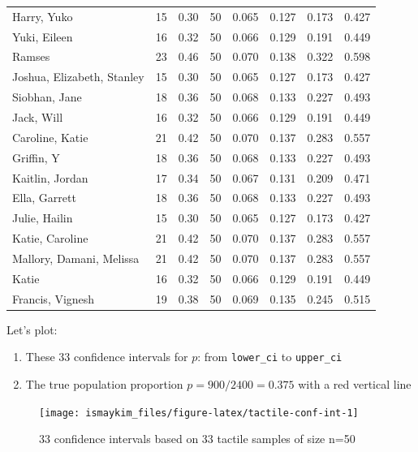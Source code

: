 \documentclass[12pt,]{krantz}
\providecommand{\tightlist}{%
  \setlength{\itemsep}{0pt}\setlength{\parskip}{0pt}}
\theoremstyle{definition}
\theoremstyle{definition}
\theoremstyle{definition}
\theoremstyle{remark}
\begin{document}
\begin{longtable}[t]{lrrrrrrr}
Harry, Yuko & 15 & 0.30 & 50 & 0.065 & 0.127 & 0.173 & 0.427\\
Yuki, Eileen & 16 & 0.32 & 50 & 0.066 & 0.129 & 0.191 & 0.449\\
\addlinespace
Ramses & 23 & 0.46 & 50 & 0.070 & 0.138 & 0.322 & 0.598\\
Joshua, Elizabeth, Stanley & 15 & 0.30 & 50 & 0.065 & 0.127 & 0.173 & 0.427\\
Siobhan, Jane & 18 & 0.36 & 50 & 0.068 & 0.133 & 0.227 & 0.493\\
Jack, Will & 16 & 0.32 & 50 & 0.066 & 0.129 & 0.191 & 0.449\\
Caroline, Katie & 21 & 0.42 & 50 & 0.070 & 0.137 & 0.283 & 0.557\\
\addlinespace
Griffin, Y & 18 & 0.36 & 50 & 0.068 & 0.133 & 0.227 & 0.493\\
Kaitlin, Jordan & 17 & 0.34 & 50 & 0.067 & 0.131 & 0.209 & 0.471\\
Ella, Garrett & 18 & 0.36 & 50 & 0.068 & 0.133 & 0.227 & 0.493\\
Julie, Hailin & 15 & 0.30 & 50 & 0.065 & 0.127 & 0.173 & 0.427\\
Katie, Caroline & 21 & 0.42 & 50 & 0.070 & 0.137 & 0.283 & 0.557\\
\addlinespace
Mallory, Damani, Melissa & 21 & 0.42 & 50 & 0.070 & 0.137 & 0.283 & 0.557\\
Katie & 16 & 0.32 & 50 & 0.066 & 0.129 & 0.191 & 0.449\\
Francis, Vignesh & 19 & 0.38 & 50 & 0.069 & 0.135 & 0.245 & 0.515\\*
\end{longtable}

\endgroup{}

Let's plot:

\begin{enumerate}
\def\labelenumi{\arabic{enumi}.}
\tightlist
\item
  These 33 confidence intervals for \(p\): from \texttt{lower\_ci} to
  \texttt{upper\_ci}
\item
  The true population proportion \(p = 900 / 2400 = 0.375\) with a red
  vertical line
\end{enumerate}

\begin{figure}

{\centering \texttt{[image: ismaykim\_files/figure-latex/tactile-conf-int-1]} 

}

\caption{33 confidence intervals based on 33 tactile samples of size n=50}\label{fig:tactile-conf-int}
\end{figure}
\end{document}
